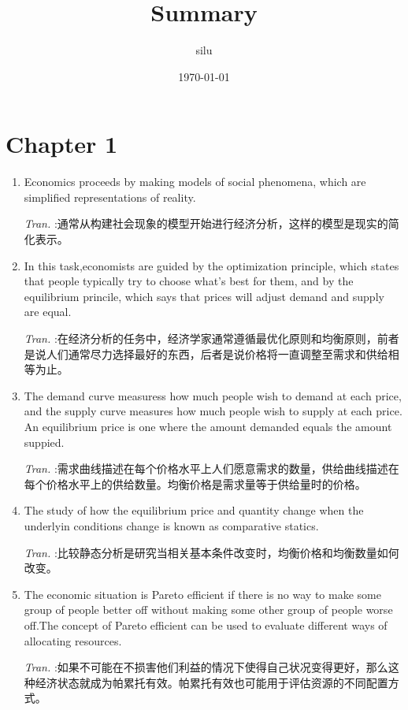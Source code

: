 \documentclass[11pt]{article}
\author{silu}
\date{\today}
\title{Summary}
\begin{document}
\maketitle
\tableofcontents


\section{Chapter 1}
\label{sec:orgabab53f}
\begin{enumerate}
\item Economics proceeds by making models of social phenomena, which are simplified representations of reality.

\emph{Tran.} :通常从构建社会现象的模型开始进行经济分析，这样的模型是现实的简化表示。
\item In this task,economists are guided by the optimization principle, which states that people typically try to choose what's best for them, and by the equilibrium princile, which says that prices will adjust demand and supply are equal.

\emph{Tran.} :在经济分析的任务中，经济学家通常遵循最优化原则和均衡原则，前者是说人们通常尽力选择最好的东西，后者是说价格将一直调整至需求和供给相等为止。
\item The demand curve measuress how much people wish to demand at each price, and the supply curve measures how much people wish to supply at each price. An equilibrium price is one where the amount demanded equals the amount suppied.

\emph{Tran.} :需求曲线描述在每个价格水平上人们愿意需求的数量，供给曲线描述在每个价格水平上的供给数量。均衡价格是需求量等于供给量时的价格。
\item The study of how the equilibrium price and quantity change when the underlyin conditions change is known as comparative statics.

\emph{Tran.} :比较静态分析是研究当相关基本条件改变时，均衡价格和均衡数量如何改变。
\item The economic situation is Pareto efficient if there is no way to make some group of people better off without making some other group of people worse off.The concept of Pareto efficient can be used to evaluate different ways of allocating resources.

\emph{Tran.} :如果不可能在不损害他们利益的情况下使得自己状况变得更好，那么这种经济状态就成为帕累托有效。帕累托有效也可能用于评估资源的不同配置方式。
\end{enumerate}
\end{document}
